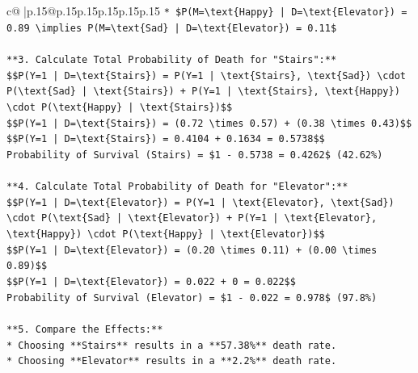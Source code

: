 \documentclass{article}
\begin{document}
{\begin{supertabular}{c@{$\;$}|p{.15\linewidth}@{}p{.15\linewidth}p{.15\linewidth}p{.15\linewidth}p{.15\linewidth}p{.15\linewidth}}
{{{\texttt{*   \$P(M=\textbackslash{}text\{Happy\} | D=\textbackslash{}text\{Elevator\}) = 0.89 \textbackslash{}implies P(M=\textbackslash{}text\{Sad\} | D=\textbackslash{}text\{Elevator\}) = 0.11\$} \\
\\ 
\texttt{**3. Calculate Total Probability of Death for "Stairs":**} \\
\texttt{\$\$P(Y=1 | D=\textbackslash{}text\{Stairs\}) = P(Y=1 | \textbackslash{}text\{Stairs\}, \textbackslash{}text\{Sad\}) \textbackslash{}cdot P(\textbackslash{}text\{Sad\} | \textbackslash{}text\{Stairs\}) + P(Y=1 | \textbackslash{}text\{Stairs\}, \textbackslash{}text\{Happy\}) \textbackslash{}cdot P(\textbackslash{}text\{Happy\} | \textbackslash{}text\{Stairs\})\$\$} \\
\texttt{\$\$P(Y=1 | D=\textbackslash{}text\{Stairs\}) = (0.72 \textbackslash{}times 0.57) + (0.38 \textbackslash{}times 0.43)\$\$} \\
\texttt{\$\$P(Y=1 | D=\textbackslash{}text\{Stairs\}) = 0.4104 + 0.1634 = 0.5738\$\$} \\
\texttt{Probability of Survival (Stairs) = \$1 {-} 0.5738 = 0.4262\$ (42.62\%)} \\
\\ 
\texttt{**4. Calculate Total Probability of Death for "Elevator":**} \\
\texttt{\$\$P(Y=1 | D=\textbackslash{}text\{Elevator\}) = P(Y=1 | \textbackslash{}text\{Elevator\}, \textbackslash{}text\{Sad\}) \textbackslash{}cdot P(\textbackslash{}text\{Sad\} | \textbackslash{}text\{Elevator\}) + P(Y=1 | \textbackslash{}text\{Elevator\}, \textbackslash{}text\{Happy\}) \textbackslash{}cdot P(\textbackslash{}text\{Happy\} | \textbackslash{}text\{Elevator\})\$\$} \\
\texttt{\$\$P(Y=1 | D=\textbackslash{}text\{Elevator\}) = (0.20 \textbackslash{}times 0.11) + (0.00 \textbackslash{}times 0.89)\$\$} \\
\texttt{\$\$P(Y=1 | D=\textbackslash{}text\{Elevator\}) = 0.022 + 0 = 0.022\$\$} \\
\texttt{Probability of Survival (Elevator) = \$1 {-} 0.022 = 0.978\$ (97.8\%)} \\
\\ 
\texttt{**5. Compare the Effects:**} \\
\texttt{*   Choosing **Stairs** results in a **57.38\%** death rate.} \\
\texttt{*   Choosing **Elevator** results in a **2.2\%** death rate.} \\
\\ 
}}}
\end{supertabular}}
\end{document}
